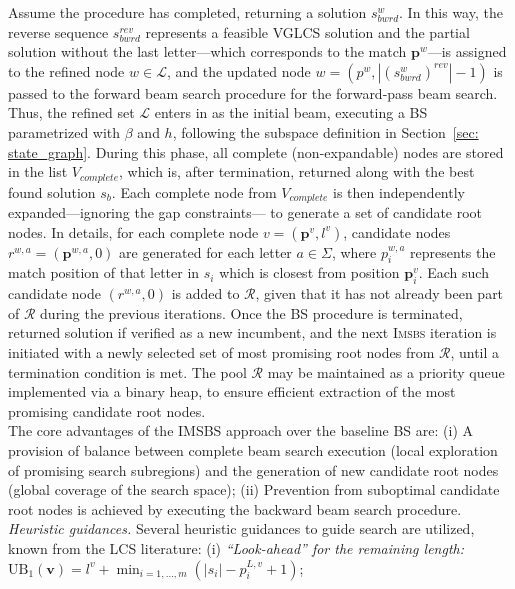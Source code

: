 \documentclass[runningheads]{llncs}
\begin{document}
Assume the procedure has completed, returning a solution $s^w_{bwrd}$. In this way, the reverse sequence $s_{bwrd}^{rev}$  represents a feasible VGLCS solution and the partial solution without the last letter---which corresponds to the match $\textbf{p}^w$---is assigned to the refined node $ w \in \mathcal{L}$, and the updated node $w=(p^w, |(s^w_{bwrd})^{rev}|-1)$ is passed to the forward beam search procedure for the forward-pass beam search. Thus, the refined set $\mathcal{L}$ enters in as the initial beam, executing a BS parametrized with $\beta$ and $h$, following the subspace definition in Section~\ref{sec: state_graph}.  During this phase, all complete (non-expandable) nodes are stored in the list $V_{complete}$, which is, after termination,  returned along with the best found solution $s_{b}$. %
Each complete node from $V_{complete}$  is then independently expanded---ignoring the gap constraints--- to generate a set of candidate root nodes. In details, for each complete node $v =(\mathbf{p}^v, l^v)$, 
candidate nodes  $r^{w, a} = (\mathbf{p}^{w, a}, 0)$ are generated for each letter $a \in \Sigma$, where $p^{w, a}_i$ represents the match position of that letter in $s_i$ which is closest from position $\textbf{p}^v_i$. Each such candidate node $(r^{w, a}, 0)$ is added to $\mathcal{R}$, given that it has not already been part of $\mathcal{R}$ during the previous iterations.  Once the BS procedure is terminated, returned solution if verified as a new incumbent, and  the next \textsc{Imsbs} iteration is initiated with a newly selected set of most promising root nodes from $\mathcal{R}$, until a termination condition is met. The pool $\mathcal{R}$ may be maintained as a priority queue implemented via a binary heap, to ensure efficient extraction of the most promising candidate root nodes. \\
The core advantages of the IMSBS approach over the baseline BS are: (i)  A provision of balance between complete beam search execution (local exploration of promising search subregions) and the generation of new candidate root nodes (global coverage of the search space); (ii) Prevention from suboptimal candidate root nodes is achieved by executing the backward beam search procedure.\\
\textit{Heuristic guidances.} Several heuristic guidances to guide search are utilized,  known from the LCS literature: (i)  \textit{``Look-ahead'' for the remaining length:} $\textrm{UB}_1(\mathbf{v}) = l^v + \min_{i = 1, \ldots, m} \left( |s_i| - p_i^{L, v} + 1 \right)$;
\end{document}
